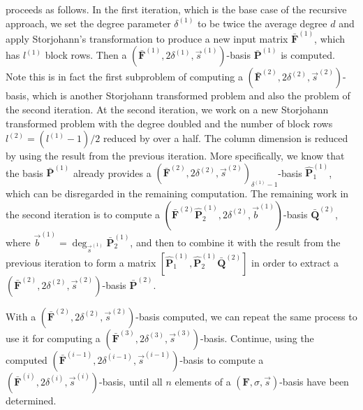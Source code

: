  proceeds as follows. In the first iteration,
which is the base case of the recursive approach, we set the degree
parameter $\delta^{\left(1\right)}$ to be twice the average degree
$d$ and apply Storjohann's transformation to produce a new input
matrix $\bar{\mathbf{F}}^{\left(1\right)}$, which has $l^{\left(1\right)}$
block rows. Then a $(\bar{\mathbf{F}}^{\left(1\right)},2\delta^{\left(1\right)},\vec{s}^{\left(1\right)})$-basis
$\bar{\mathbf{P}}^{\left(1\right)}$ is computed. Note this is in
fact the first subproblem of computing a $(\bar{\mathbf{F}}^{\left(2\right)},2\delta^{\left(2\right)},\vec{s}^{\left(2\right)})$-basis,
which is another Storjohann transformed problem and also the problem
of the second iteration. At the second iteration, we work on a new
Storjohann transformed problem with the degree doubled and the number
of block rows $l^{\left(2\right)}=(l^{\left(1\right)}-1)/2$ reduced
by over a half. The column dimension is reduced by using the result
from the previous iteration. More specifically, we know that the basis
$\bar{\mathbf{P}}^{\left(1\right)}$ already provides a $(\bar{\mathbf{F}}^{\left(2\right)},2\delta^{\left(2\right)},\vec{s}^{\left(2\right)})_{\delta^{\left(1\right)}-1}$-basis
$\hat{\mathbf{P}}_{1}^{\left(1\right)}$, which can be disregarded
in the remaining computation. The remaining work in the second iteration
is to compute a $(\bar{\mathbf{F}}^{\left(2\right)}\hat{\mathbf{P}}_{2}^{\left(1\right)},2\delta^{\left(2\right)},\vec{b}^{\left(1\right)})$-basis
$\bar{\mathbf{Q}}^{\left(2\right)}$, where $\vec{b}^{\left(1\right)}=\deg_{\vec{s}^{\left(1\right)}}\bar{\mathbf{P}}_{2}^{\left(1\right)}$,
and then to combine it with the result from the previous iteration
to form a matrix $[\hat{\mathbf{P}}_{1}^{\left(1\right)},\hat{\mathbf{P}}_{2}^{\left(1\right)}\bar{\mathbf{Q}}^{\left(2\right)}]$
in order to extract a $(\bar{\mathbf{F}}^{\left(2\right)},2\delta^{\left(2\right)},\vec{s}^{\left(2\right)})$-basis
$\bar{\mathbf{P}}^{\left(2\right)}$.

With a $(\bar{\mathbf{F}}^{\left(2\right)},2\delta^{\left(2\right)},\vec{s}^{\left(2\right)})$-basis
computed, we can repeat the same process to use it for computing a
$(\bar{\mathbf{F}}^{\left(3\right)},2\delta^{\left(3\right)},\vec{s}^{\left(3\right)})$-basis.
Continue, using the computed $(\bar{\mathbf{F}}^{\left(i-1\right)},2\delta^{\left(i-1\right)},\vec{s}^{\left(i-1\right)})$-basis
to compute a $(\bar{\mathbf{F}}^{\left(i\right)},2\delta^{\left(i\right)},\vec{s}^{\left(i\right)})$-basis,
until all $n$ elements of a $\left(\mathbf{F},\sigma,\vec{s}\right)$-basis
have been determined.



\begin{comment}
\begin{thm}
Algorithm \prettyref{alg:mab} computes a $\left(\mathbf{F},\sigma,\vec{s}\right)$-basis
correctly.\end{thm}
\begin{proof}
This follows from \prettyref{lem:simplifySecondSubproblem}, \prettyref{lem:disregardComputedBasisElements},
and \prettyref{lem:computationAtTopLevel}. \end{proof}
\end{comment}
{} 
